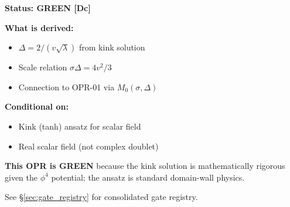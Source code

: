 \begin{tcolorbox}[colback=green!10!white, colframe=green!60!black,
    title=\textbf{OPR-04: Stoplight Verdict}]

\textbf{Status: \textcolor{OliveGreen}{GREEN} [Dc]}

\textbf{What is derived:}
\begin{itemize}[nosep]
\item $\Delta = 2/(v\sqrt{\lambda})$ from kink solution
\item Scale relation $\sigma\Delta = 4v^2/3$
\item Connection to OPR-01 via $M_0(\sigma, \Delta)$
\end{itemize}

\textbf{Conditional on:}
\begin{itemize}[nosep]
\item Kink (tanh) ansatz for scalar field
\item Real scalar field (not complex doublet)
\end{itemize}

\textbf{This OPR is GREEN} because the kink solution is mathematically rigorous
given the $\phi^4$ potential; the ansatz is standard domain-wall physics.

See \S\ref{sec:gate_registry} for consolidated gate registry.
\end{tcolorbox}

